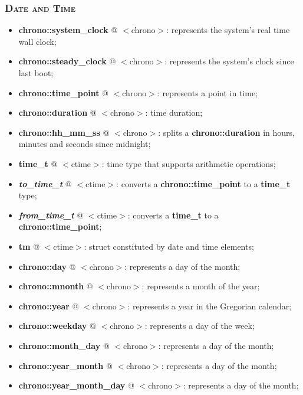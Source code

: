 \documentclass[10pt]{article}
\begin{document}
\begin{multicols*}{5}
{{\subsubsection*{\textsc{Date and Time}} 
\begin{itemize}[leftmargin=*,topsep=0.25pt]
  \setlength\itemsep{-1.8pt}
\item  {\textbf{chrono::system\_clock}} @ $<$chrono$>$: represents the system's real time wall clock; 
\item  {\textbf{chrono::steady\_clock}} @ $<$chrono$>$: represents the system's clock since last boot; 
\item  {\textbf{chrono::time\_point}} @ $<$chrono$>$: represents a point in time; 
\item  {\textbf{chrono::duration}} @ $<$chrono$>$: time duration; 
\item  {\textbf{chrono::hh\_mm\_ss}} @ $<$chrono$>$: splits a \textbf{chrono::duration} in hours, minutes and seconds since midnight;
\item  {\textbf{time\_t}} @ $<$ctime$>$: time type that supports arithmetic operations;
\item  \emph{\textbf{to\_time\_t}} @ $<$ctime$>$: converts a \textbf{chrono::time\_point} to a {\textbf{time\_t}} type;
\item  \emph{\textbf{from\_time\_t}} @ $<$ctime$>$: converts a {\textbf{time\_t}} to a \textbf{chrono::time\_point};
\item  \textbf{tm} @ $<$ctime$>$: struct constituted by date and time elements;
\item  {\textbf{chrono::day}} @ $<$chrono$>$: represents a day of the month;
\item  {\textbf{chrono::mnonth}} @ $<$chrono$>$: represents a month of the year;
\item  {\textbf{chrono::year}} @ $<$chrono$>$: represents a year in the Gregorian calendar;
\item  {\textbf{chrono::weekday}} @ $<$chrono$>$: represents a day of the week;
\item  {\textbf{chrono::month\_day}} @ $<$chrono$>$: represents a day of the month;
\item  {\textbf{chrono::year\_month}} @ $<$chrono$>$: represents a day of the month;
\item  {\textbf{chrono::year\_month\_day}} @ $<$chrono$>$: represents a day of the month;


\end{itemize}


}}
\end{multicols*}
\end{document}
